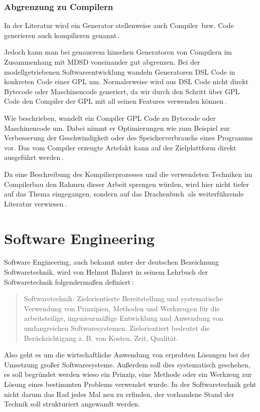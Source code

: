 \documentclass[12pt,oneside,a4paper,parskip]{scrbook}
\begin{document}
\subsubsection{Abgrenzung zu Compilern}

In der Literatur wird ein Generator stellenweise auch Compiler\,\cite[S. 26]{voelter2013} bzw. Code generieren auch kompilieren genannt\,\cite[S. 19]{fowler2010}.

Jedoch kann man bei genauerem hinsehen Generatoren von Compilern im Zusammenhang mit MDSD voneinander gut abgrenzen. Bei der modellgetriebenen Softwareentwicklung wandeln Generatoren DSL Code in konkreten Code einer GPL um. Normalerweise wird aus DSL Code nicht direkt Bytecode oder Maschinencode generiert, da wir durch den Schritt über GPL Code den Compiler der GPL mit all seinen Features verwenden können\,\cite[S. 11]{voelter2013}.
	
Wie beschrieben, wandelt ein Compiler GPL Code zu Bytecode oder Maschinencode um. Dabei nimmt er Optimierungen wie zum Beispiel zur Verbesserung der Geschwindigkeit oder des Speicherverbrauchs eines Programms vor. Das vom Compiler erzeugte Artefakt kann auf der Zielplattform direkt ausgeführt werden\,\cite[S. 345ff.]{czaeis2000}.
	
Da eine Beschreibung des Kompilierprozesses und die verwendeten Techniken im Compilerbau den Rahmen dieser Arbeit sprengen würden, wird hier nicht tiefer auf das Thema eingegangen, sondern auf das \glqq Drachenbuch\grqq\ als weiterführende Literatur verwiesen\,\cite{aho2006}.

\section{Software Engineering}

Software Engineering, auch bekannt unter der deutschen Bezeichnung Softwaretechnik, wird von Helmut Balzert in seinem Lehrbuch der Softwaretechnik folgendermaßen definiert\,\cite[S.17]{balzert2009a}:

\begin{quote}
	Softwaretechnik: Zielorientierte Bereitstellung und systematische Verwendung von Prinzipien, Methoden und Werkzeugen für	die arbeitsteilige, ingenieurmäßige Entwicklung und Anwendung von umfangreichen Softwaresystemen. Zielorientiert bedeutet die	Berücksichtigung z. B. von Kosten, Zeit, Qualität.
\end{quote}

Also geht es um die wirtschaftliche Anwendung von erprobten Lösungen bei der Umsetzung großer Softwaresysteme. Außerdem soll dies systematisch geschehen, es soll begründet werden wieso ein Prinzip, eine Methode oder ein Werkzeug zur Lösung eines bestimmten Problems verwendet wurde. In der Softwaretechnik geht nicht darum das Rad jedes Mal neu zu erfinden, der vorhandene Stand der Technik soll strukturiert angewandt werden.
\end{document}
